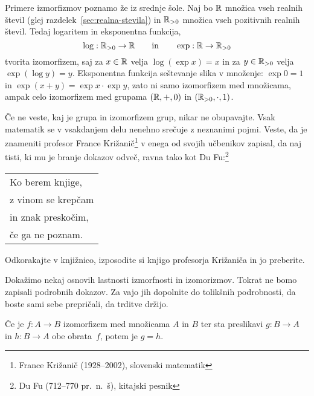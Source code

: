 \begin{zgled}\label{zgled:logaritmiranje-je-obratno-od-eksponenciranja}
  Primere izmorfizmov poznamo že iz srednje šole. Naj bo $\mathbb{R}$ množica vseh realnih števil
  (glej razdelek~\ref{sec:realna-stevila}) in $\mathbb{R}_{>0}$ množica vseh pozitivnih realnih
  števil. Tedaj logaritem in eksponentna funkcija,
  \begin{equation*}
    \log : \mathbb{R}_{>0} \to \mathbb{R}
    \qquad\text{in}\qquad
    \exp : \mathbb{R} \to \mathbb{R}_{>0}
  \end{equation*}
  tvorita izomorfizem, saj za $x \in \mathbb{R}$ velja $\log (\exp x) = x$ in za $y \in \mathbb{R}_{>0}$
  velja $\exp (\log y) = y$. Eksponentna funkcija seštevanje slika v množenje:
  $\exp 0 = 1$ in $\exp (x + y) = \exp x \cdot \exp y$, zato ni samo izomorfizem med
  množicama, ampak celo izomorfizem med grupama $(\mathbb{R}, {+}, 0)$ in
  $(\mathbb{R}_{>0}, {\cdot}, 1)$.

  Če ne veste, kaj je grupa in izomorfizem grup, nikar ne obupavajte. Vsak matematik se v
  vsakdanjem delu nenehno srečuje z neznanimi pojmi. Veste, da je znameniti profesor
  France Križanič\footnote{France Križanič (1928--2002), slovenski matematik} v enega od
  svojih učbenikov zapisal, da naj tisti, ki mu je branje dokazov odveč, ravna tako kot Du
  Fu:\footnote{Du Fu (712--770 pr.~n.~š), kitajski pesnik}
  \begin{center}
    \begin{tabular}{l}
      Ko berem knjige,\\
      z vinom se krepčam\\
      in znak preskočim,\\
      če ga ne poznam.
    \end{tabular}
  \end{center}
\end{zgled}

\begin{naloga}
  Odkorakajte v knjižnico, izposodite si knjigo profesorja Križaniča in jo preberite.
\end{naloga}

Dokažimo nekaj osnovih lastnosti izmorfnosti in izomorizmov. Tokrat ne bomo zapisali
podrobnih dokazov. Za vajo jih dopolnite do tolikšnih podrobnosti, da boste sami sebe
prepričali, da trditve držijo.

\begin{trditev}
  Če je $f : A \to B$ izomorfizem med množicama $A$ in $B$ ter sta preslikavi
  $g : B \to A$ in $h : B \to A$ obe obrata~$f$, potem je $g = h$.
\end{trditev}

